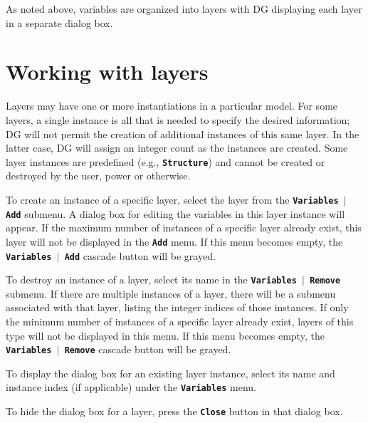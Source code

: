 \documentclass[12pt]{report}
\begin{document}
As noted above, variables are organized 
into layers with DG displaying each
layer in a separate dialog box.

\section{Working with layers}

Layers may have one or more instantiations in a particular
model.  For some layers, a single instance is 
all that is needed 
to specify the desired information; DG will not
permit the creation of additional instances of this same
layer.  In the latter case, DG will assign an integer
count as the instances are created. 
Some layer instances are predefined (e.g., 
\textbf{\texttt{Structure}}) and cannot be created or destroyed
by the user, power or otherwise.

To create an instance of a specific layer, select the
layer from the
\textbf{\texttt{Variables  \begin{math}\vert{}\end{math}  Add}} submenu. A
dialog box for editing the variables in this layer
instance will
appear. If the maximum number of instances of a specific layer already
exist, this layer will not be displayed in the \textbf{\texttt{Add}}
menu. If this menu
becomes empty, the
\textbf{\texttt{Variables  \begin{math}\vert{}\end{math}  Add}} cascade
button will be grayed.

To destroy an instance of a layer, select its name in the
\textbf{\texttt{Variables  \begin{math}\vert{}\end{math}  Remove}} submenu.
If there are multiple instances of a layer, there will be a submenu associated
with that layer, listing the integer indices of those instances.
If only the minimum number of instances of a specific layer already exist,
layers of this type will not be displayed in this menu. If this menu
becomes empty, the
\textbf{\texttt{Variables \begin{math}\vert{}\end{math} Remove}} cascade
button will be grayed.

To display the dialog box for an existing layer instance, select its name 
and instance index (if applicable) under 
the \textbf{\texttt{Variables}} menu.

To hide the dialog box for a layer, press the \textbf{\texttt{Close}}
button in that dialog box.
\end{document}
